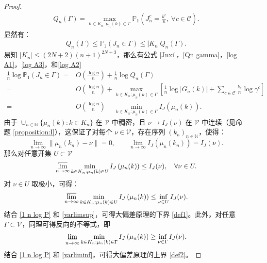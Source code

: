\begin{appendices}
\begin{proof}
\begin{align*}
Q_n(\Gamma) = \max_{k\in K_n: \mu_n(k) \in \Gamma}
\mathbb{P}_1\left(J^c_{n} = \frac{k^c}{n},\ \forall c\in\mathcal{C}\right).
\end{align*}
显然有：
\begin{align}\label{Qn gamma}
	Q_n(\Gamma)
	\le \mathbb{P}_1\left(J_{n} \in \Gamma\right)
	\le |K_n| Q_n(\Gamma).
\end{align}
易知 $|K_n| \le (2N+2)(n+1)^{2N+3}$，那么有公式 \eqref{Jnxi}，\eqref{Qn gamma}，\eqref{log A1}，\eqref{log A3}，和\eqref{log A2}
\begin{equation}\label{1 n log P}
	\begin{split}
	\frac{1}{n}\log\mathbb{P}_1\left(J_{n} \in \Gamma\right)=&O\left(\frac{\log n}{n}\right)+\frac{1}{n}\log Q_n(\Gamma)\\
	=&O\left(\frac{\log n}{n}\right)+\max_{k\in K_n: \mu_n(k) \in \Gamma}\left[\frac{1}{n}\log |G_{n}(k)|+\sum_{c \in \mathcal{C}}\frac{k_c}{n}\log \gamma^c\right]\\
	=&O\left(\frac{\log n}{n}\right)-\min_{k\in K_n: \mu_n(k) \in \Gamma}I_J\left(\mu_{n}(k)\right).
	\end{split}
\end{equation}
由于 $\cup_{n\in\mathbb{N}} \{\mu_{n}(k):k\in K_n\}$ 在 $\mathcal{V}$ 中稠密，且 $\nu\to I_J(\nu)$ 在 $\mathcal{V}$ 中连续（见命题 \ref{proposition:I}），这保证了对每个 $\nu\in \mathcal{V}$，存在序列 $(k_n)_{n\in \mathbb{N}}$，使得：
\begin{equation*}
\lim_{n\to\infty} \|\mu_{n}(k_n)-\nu\| = 0, \qquad \lim_{n\to\infty} I_J\left(\mu_{n}(k_n)\right) = I_J(\nu).
\end{equation*}
那么对任意开集 $U\subset \mathcal{V}$
\begin{equation*}
\varlimsup_{n\to\infty}\min_{k\in K_n: \mu_n(k) \in U}I_J\left(\mu_{n}(k)\right)\le I_J(\nu),\quad\forall\nu\in U.
\end{equation*}
对 $\nu\in U$ 取极小，可得：
\begin{equation}\label{varlimsup}
\varlimsup_{n\to\infty}\min_{k\in K_n: \mu_n(k) \in U}I_J\left(\mu_{n}(k)\right)\le \inf_{\nu\in U}I_J(\nu).
\end{equation}
结合 \eqref{1 n log P} 和 \eqref{varlimsup}，可得大偏差原理的下界 \eqref{def1}。此外，对任意$\Gamma \subset \mathcal{V}$，同理可得反向的不等式，即
\begin{equation}\label{varliminf}
\varliminf_{n\to\infty}\min_{k\in K_n: \mu_n(k) \in \Gamma}I_J\left(\mu_{n}(k)\right)\ge \inf_{\nu\in \Gamma}I_J(\nu).
\end{equation}
结合 \eqref{1 n log P} 和 \eqref{varliminf}，可得大偏差原理的上界 \eqref{def2}。
\end{proof}


\end{appendices}
